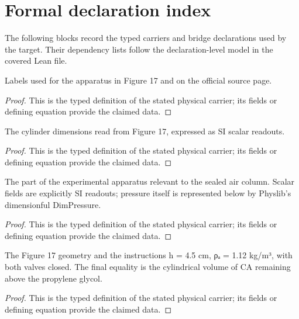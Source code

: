 \section*{Formal declaration index}
The following blocks record the typed carriers and bridge declarations used by the target.  Their dependency lists follow the declaration-level model in the covered Lean file.

\begin{definition}
  \label{def:physics:IPhO_2026_4_A_5:aux001}
  Labels used for the apparatus in Figure 17 and on the official source page.
\end{definition}
\begin{proof}
  This is the typed definition of the stated physical carrier; its fields or defining equation provide the claimed data.
\end{proof}

\begin{definition}
  \label{def:physics:IPhO_2026_4_A_5:aux002}
  The cylinder dimensions read from Figure 17, expressed as SI scalar readouts.
\end{definition}
\begin{proof}
  This is the typed definition of the stated physical carrier; its fields or defining equation provide the claimed data.
\end{proof}

\begin{definition}
  \label{def:physics:IPhO_2026_4_A_5:aux003}
  The part of the experimental apparatus relevant to the sealed air column. Scalar fields are explicitly SI readouts; pressure itself is represented below by Physlib's dimensionful DimPressure.
\end{definition}
\begin{proof}
  This is the typed definition of the stated physical carrier; its fields or defining equation provide the claimed data.
\end{proof}

\begin{definition}
  \label{def:physics:IPhO_2026_4_A_5:aux004}
  The Figure 17 geometry and the instructions h = 4.5 cm, ρₐ = 1.12 kg/m³, with both valves closed. The final equality is the cylindrical volume of CA remaining above the propylene glycol.
\end{definition}
\begin{proof}
  This is the typed definition of the stated physical carrier; its fields or defining equation provide the claimed data.
\end{proof}

